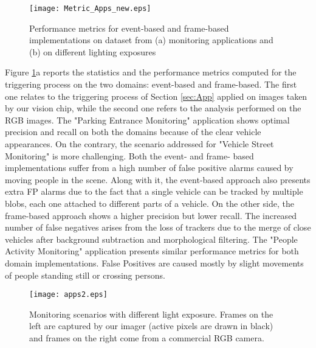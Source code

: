 \documentclass[journal]{IEEEtran}
\begin{document}
\begin{figure}[]
	\centering
  	\texttt{[image: Metric\_Apps\_new.eps]}
	\caption{Performance metrics for event-based and frame-based implementations on dataset from (a) monitoring applications and (b) on different lighting exposures}
	\label{fig:metric}       %
\end{figure}

Figure \ref{fig:metric}a reports the statistics and the performance metrics computed for the triggering process on the two domains: event-based and frame-based. The first one relates to the triggering process of Section \ref{sec:App} applied on images taken by our vision chip, while the second one refers to the analysis performed on the RGB images. The "Parking Entrance Monitoring" application shows optimal precision and recall on both the domains because of the clear vehicle appearances. On the contrary, the scenario addressed for "Vehicle Street Monitoring" is more challenging. Both the event- and frame- based implementations suffer from a high number of false positive alarms caused by moving people in the scene. Along with it, the event-based approach also presents extra FP alarms due to the fact that a single vehicle can be tracked by multiple blobs, each one attached to different parts of a vehicle. On the other side, the frame-based approach shows a higher precision but lower recall. The increased number of false negatives arises from the loss of trackers due to the merge of close vehicles after background subtraction and morphological filtering.
The "People Activity Monitoring" application presents similar performance metrics for both domain implementations. False Positives are caused mostly by slight movements of people standing still or crossing persons. 

\begin{figure}[b]
	\centering
  	\texttt{[image: apps2.eps]}
	\caption{Monitoring scenarios with different light exposure. Frames on the left are captured by our imager (active pixels are drawn in black) and frames on the right come from a commercial RGB  camera.  }
	\label{fig:apps2_fig}       %
\end{figure}
\end{document}

